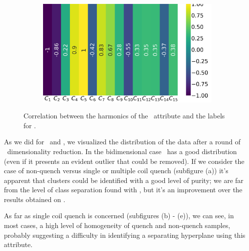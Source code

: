 \begin{figure}[!h]
\begin{subfigure}{0.49\linewidth}
	\end{subfigure}
	\begin{subfigure}{0.49\linewidth}
		\includegraphics[width=\linewidth]{img/qlp_corr/Cnmod_coil3.png}
	\end{subfigure}
	\caption{Correlation between the harmonics of the \cnmod\ attribute and the labels for \qlp.}
	\label{fig:cnmod-lcorr-qlp}
\end{figure}

As we did for \an\ and \bn, we visualized the distribution of the data after a round of \pca\
dimensionality reduction. In the bidimensional case \cnmod\ has a good distribution (even if it
presents an evident outlier that could be removed). If we consider the case of non-quench versus
single or multiple coil quench (subfigure (a)) it's apparent that clusters could be identified with
a good level of purity; we are far from the level of class separation found with \an, but it's an
improvement over the results obtained on \bn.

As far as single coil quench is concerned (subfigures (b) - (e)), we can see, in most cases, a high
level of homogeneity of quench and non-quench samples, probably suggesting a difficulty in
identifying a separating hyperplane using this attribute.

